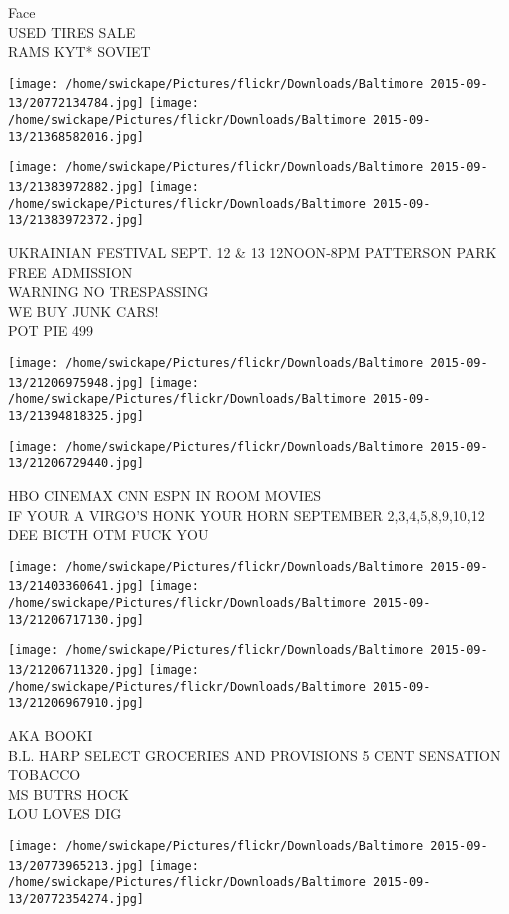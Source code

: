\documentclass[10pt,letterpaper]{article}
\begin{document}
Face\\
USED TIRES SALE\\
RAMS KYT* SOVIET
\pagebreak

\texttt{[image: /home/swickape/Pictures/flickr/Downloads/Baltimore 2015-09-13/20772134784.jpg]}
\texttt{[image: /home/swickape/Pictures/flickr/Downloads/Baltimore 2015-09-13/21368582016.jpg]}

\texttt{[image: /home/swickape/Pictures/flickr/Downloads/Baltimore 2015-09-13/21383972882.jpg]}
\texttt{[image: /home/swickape/Pictures/flickr/Downloads/Baltimore 2015-09-13/21383972372.jpg]}

UKRAINIAN FESTIVAL SEPT. 12 \& 13 12NOON{-}8PM PATTERSON PARK FREE ADMISSION\\
WARNING NO TRESPASSING\\
WE BUY JUNK CARS!\\
POT PIE 499
\pagebreak

\texttt{[image: /home/swickape/Pictures/flickr/Downloads/Baltimore 2015-09-13/21206975948.jpg]}
\texttt{[image: /home/swickape/Pictures/flickr/Downloads/Baltimore 2015-09-13/21394818325.jpg]}

\vspace{0.25in}
\texttt{[image: /home/swickape/Pictures/flickr/Downloads/Baltimore 2015-09-13/21206729440.jpg]}

HBO CINEMAX CNN ESPN IN ROOM MOVIES\\
IF YOUR A VIRGO'S HONK YOUR HORN SEPTEMBER 2,3,4,5,8,9,10,12\\
DEE BICTH OTM FUCK YOU
\pagebreak

\texttt{[image: /home/swickape/Pictures/flickr/Downloads/Baltimore 2015-09-13/21403360641.jpg]}
\texttt{[image: /home/swickape/Pictures/flickr/Downloads/Baltimore 2015-09-13/21206717130.jpg]}

\texttt{[image: /home/swickape/Pictures/flickr/Downloads/Baltimore 2015-09-13/21206711320.jpg]}
\texttt{[image: /home/swickape/Pictures/flickr/Downloads/Baltimore 2015-09-13/21206967910.jpg]}

AKA BOOKI\\
B.L. HARP SELECT GROCERIES AND PROVISIONS 5 CENT SENSATION TOBACCO\\
MS BUTRS HOCK\\
LOU LOVES DIG
\pagebreak

\texttt{[image: /home/swickape/Pictures/flickr/Downloads/Baltimore 2015-09-13/20773965213.jpg]}
\texttt{[image: /home/swickape/Pictures/flickr/Downloads/Baltimore 2015-09-13/20772354274.jpg]}
\end{document}
